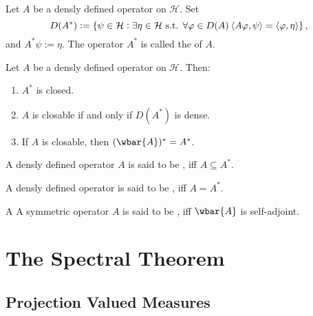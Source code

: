 \begin{definition}[Adjoint]
	Let $A$ be a densly defined operator on $\mathcal{H}$. Set
	\begin{equation*}
		D(A^*) := \cbr[0]{\psi \in \mathcal{H} : \exists \eta \in \mathcal{H} \text{ s.t. } \forall \varphi \in D(A) \>\langle A \varphi,\psi \rangle = \langle \varphi,\eta \rangle},
	\end{equation*}
	\noindent and $A^*\psi := \eta$. The operator $A^*$ is called the  of $A$.
\end{definition}

\begin{theorem}
	Let $A$ be a densly defined operator on $\mathcal{H}$. Then:
	\begin{enumerate}[label = \textup{(}\alph*\textup{)},wide=0pt]
		\item $A^*$ is closed.
		\item $A$ is closable if and only if $D(A^*)$ is dense.
		\item If $A$ is closable, then $(\wbar{A})^* = A^*$.
	\end{enumerate}
\end{theorem}

\begin{definition}
	A densly defined operator $A$ is said to be , iff $A \subseteq A^*$.
\end{definition}

\begin{definition}
	A densly defined operator is said to be , iff $A = A^*$.
\end{definition}

\begin{definition}
	A A symmetric operator $A$ is said to be , iff $\wbar{A}$ is self-adjoint.
\end{definition}

\section*{The Spectral Theorem}
\subsection*{Projection Valued Measures}


